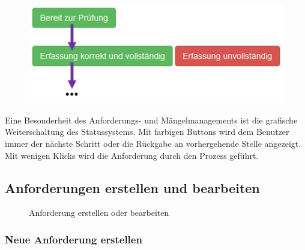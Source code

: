 \begin{figure}   %
  \vspace{-25pt}      %
  \begin{center}
    \includegraphics[width=1\linewidth]{../chapters/06_Anf-Maengelmanagement/pictures/amm_grafStatus.jpg}
  \end{center}
  \vspace{-20pt}
  \vspace{-10pt}
\end{figure}
Eine Besonderheit des Anforderungs- und Mängelmanagements ist die grafische Weiterschaltung des Statussystems. Mit farbigen Buttons wird dem Benutzer immer der nächste Schritt oder die Rückgabe an vorhergehende Stelle angezeigt. Mit wenigen Klicks wird die Anforderung durch den Prozess geführt.

\subsection{Anforderungen erstellen und bearbeiten}
\label{bkm:Ref2018071810}

\begin{figure}[H]
\caption{Anforderung erstellen oder bearbeiten}
\end{figure}

\subsubsection{Neue Anforderung erstellen}

